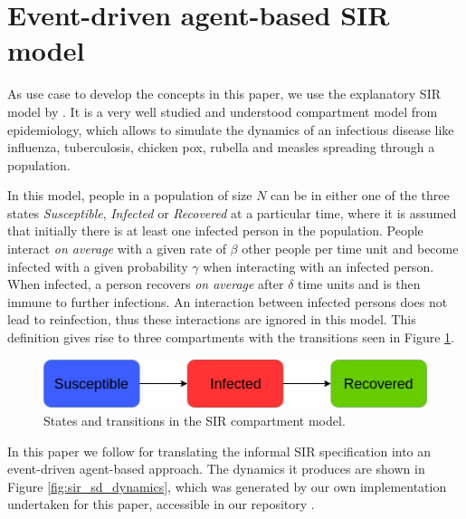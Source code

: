 \section{Event-driven agent-based SIR model}
\label{sec:sirmodel}
As use case to develop the concepts in this paper, we use the explanatory SIR model by \cite{kermack_contribution_1927}. It is a very well studied and understood compartment model from epidemiology, which allows to simulate the dynamics of an infectious disease like influenza, tuberculosis, chicken pox, rubella and measles spreading through a population. 

In this model, people in a population of size $N$ can be in either one of the three states \textit{Susceptible}, \textit{Infected} or \textit{Recovered} at a particular time, where it is assumed that initially there is at least one infected person in the population. People interact \textit{on average} with a given rate of $\beta$ other people per time unit and become infected with a given probability $\gamma$ when interacting with an infected person. When infected, a person recovers \textit{on average} after $\delta$ time units and is then immune to further infections. An interaction between infected persons does not lead to reinfection, thus these interactions are ignored in this model. This definition gives rise to three compartments with the transitions seen in Figure \ref{fig:sir_transitions}.

\begin{figure}
	\centering
	\includegraphics[width=.7\textwidth, angle=0]{./fig/SIR_transitions.png}
	\caption{States and transitions in the SIR compartment model.}
	\label{fig:sir_transitions}
\end{figure}

In this paper we follow \cite{macal_agent-based_2010} for translating the informal SIR specification into an event-driven agent-based approach. The dynamics it produces are shown in Figure \ref{fig:sir_sd_dynamics}, which was generated by our own implementation undertaken for this paper, accessible in our repository \citep{thaler_repository_2019}.

